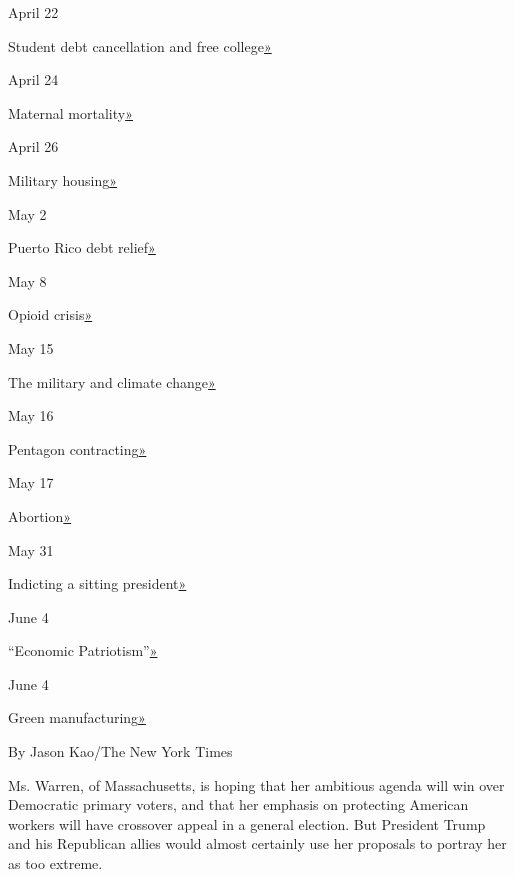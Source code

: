 April 22

Student debt cancellation and free
college\href{https://medium.com/@teamwarren/im-calling-for-something-truly-transformational-universal-free-public-college-and-cancellation-of-a246cd0f910f}{»}

April 24

Maternal
mortality\href{https://twitter.com/ewarren/status/1121164657455136768}{»}

April 26

Military
housing\href{https://medium.com/@teamwarren/my-plan-to-improve-our-military-housing-b1a46ba235b8}{»}

May 2

Puerto Rico debt
relief\href{https://medium.com/@teamwarren/my-plan-to-provide-comprehensive-debt-relief-to-puerto-rico-f8b575a81b06}{»}

May 8

Opioid
crisis\href{https://medium.com/@teamwarren/my-comprehensive-plan-to-end-the-opioid-crisis-9d85deaa3ccb}{»}

May 15

The military and climate
change\href{https://medium.com/@teamwarren/our-military-can-help-lead-the-fight-in-combating-climate-change-2955003555a3}{»}

May 16

Pentagon
contracting\href{https://medium.com/@teamwarren/its-time-to-reduce-corporate-influence-at-the-pentagon-98f52ee0fcf1}{»}

May 17

Abortion\href{https://medium.com/@teamwarren/congressional-action-to-protect-choice-aaf94ed25fb5}{»}

May 31

Indicting a sitting
president\href{https://medium.com/@teamwarren/no-president-is-above-the-law-f4812e580336}{»}

June 4

``Economic
Patriotism''\href{https://medium.com/@teamwarren/a-plan-for-economic-patriotism-13b879f4cfc7}{»}

June 4

Green
manufacturing\href{https://medium.com/@teamwarren/my-green-manufacturing-plan-for-america-fc0ad53ab614}{»}

By Jason Kao/The New York Times

Ms. Warren, of Massachusetts, is hoping that her ambitious agenda will
win over Democratic primary voters, and that her emphasis on protecting
American workers will have crossover appeal in a general election. But
President Trump and his Republican allies would almost certainly use her
proposals to portray her as too extreme.


